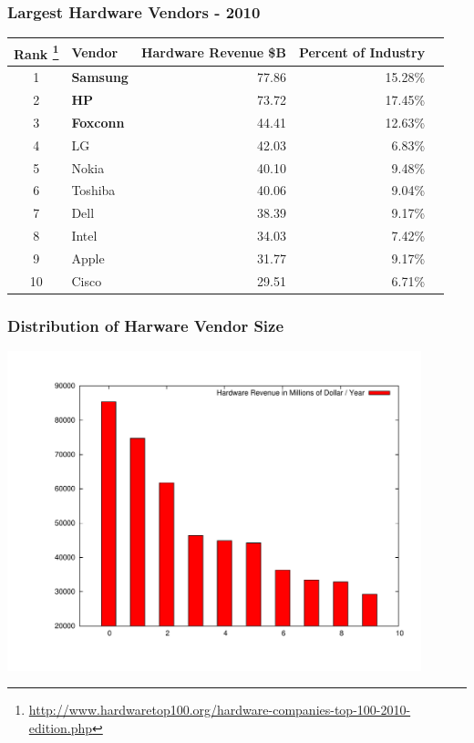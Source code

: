 \documentclass[18pt]{beamer}
\begin{document}
{
\begin{frame}
\frametitle{Largest Hardware Vendors - 2010}

\begin{center}
\begin{tabular}{clrrr}
\hline
  \textbf{Rank
\footnote{
\url{http://www.hardwaretop100.org/hardware-companies-top-100-2010-edition.php}}
} &\textbf{Vendor} & \textbf{Hardware Revenue \$B} & \textbf{Percent of Industry} \\
\hline
\hline
1 &  \textbf{Samsung} & 77.86 & 15.28\% \\
2 &  \textbf{HP} & 73.72 &  17.45\% \\
3 &  \textbf{Foxconn} & 44.41 &  12.63\% \\
4 &  LG & 42.03 & 6.83\% \\
5 &  Nokia & 40.10 & 9.48\% \\
6 &  Toshiba & 40.06 &  9.04\% \\
7 &  Dell & 38.39 & 9.17\% \\
8 &  Intel & 34.03 &  7.42\% \\
9 &  Apple & 31.77 & 9.17\% \\
10 &  Cisco & 29.51 &  6.71\% \\
\end{tabular}

\end{center}
\end{frame}
}
\begin{frame}
\frametitle{Distribution of Harware Vendor Size}
  \includegraphics[width=0.9\textwidth,height=0.9\paperheight]{../Art/LargestHardwareVendorsPlot.pdf}
\end{frame}
\end{document}
